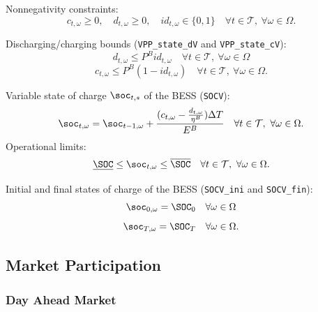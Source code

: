 Nonnegativity  constraints:
\begin{equation} \label{dVdCPos1}
	c_{t, \omega} \geq 0, \quad d_{t, \omega} \geq 0, \quad id_{t, \omega} \in \{ 0, 1 \} \quad \forall t \in \mathcal{T}, \ \forall \omega \in \Omega.
\end{equation}

Discharging/charging bounds (\verb|VPP_state_dV| and \verb|VPP_state_cV|):
\begin{equation} \label{EQ:VPP_state_dV1}
	d_{t, \omega} \leq P^B id_{t, \omega} \quad \forall t \in \mathcal{T}, \ \forall \omega \in \Omega
\end{equation}
\begin{equation} \label{EQ:VPP_state_cV1}
	c_{t, \omega} \leq P^B (1 - id_{t, \omega}) \quad \forall t \in \mathcal{T}, \ \forall \omega \in \Omega.
\end{equation}

Variable state of charge $\soc_{t, s}$ of the BESS (\verb|SOCV|): 
\begin{equation} \label{EQ:SOCV1}
	\soc_{t, \omega} = \soc_{t - 1, \omega} + \frac{(c_{t, \omega} - \frac{d_{t, \omega}}{\eta^B})\Delta T}{E^B} \quad \forall t \in \mathcal{T}, \ \forall \omega \in \Omega. 
\end{equation} 
Operational limits:
\begin{equation} \label{EQ:socVOperLimits1}
	\underline{\SOC} \leq \soc_{t, \omega} \leq \overline{\SOC} \quad \forall t \in \mathcal{T}, \ \forall \omega \in \Omega.
\end{equation}

Initial and final states of charge of the BESS (\verb|SOCV_ini| and \verb|SOCV_fin|):
\begin{equation} \label{EQ:SOCV_ini1}
	\soc_{0, \omega} = \SOC_0 \quad \forall \omega \in \Omega
\end{equation}
\begin{equation} \label{EQ:SOCV_fin1}
	\soc_{T, \omega} = \SOC_T \quad \forall \omega \in \Omega.
\end{equation}

\subsection{Market Participation}
\label{SEC:MarketParticipation1}

\subsubsection{Day Ahead Market}

